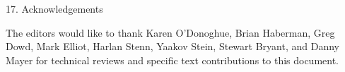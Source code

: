 17.  Acknowledgements

   The editors would like to thank Karen O'Donoghue, Brian Haberman,
   Greg Dowd, Mark Elliot, Harlan Stenn, Yaakov Stein, Stewart Bryant,
   and Danny Mayer for technical reviews and specific text contributions
   to this document.
